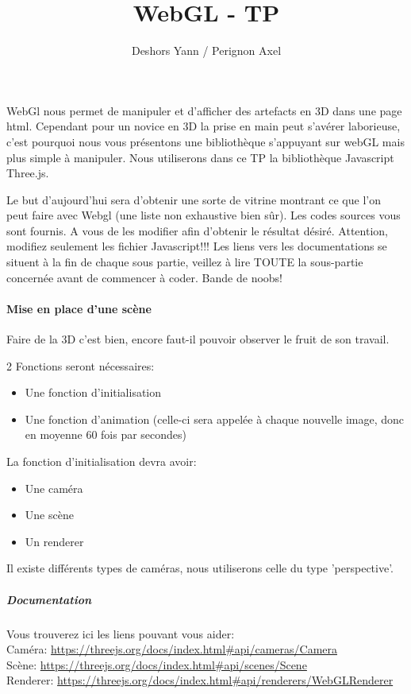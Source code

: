 \documentclass[a4paper,10pt]{article}
\title{WebGL - TP}
\author{Deshors Yann / Perignon Axel}
\begin{document}
\maketitle

WebGl nous permet de manipuler et d'afficher des artefacts en 3D dans une page html.
Cependant pour un novice en 3D la prise en main peut s'avérer laborieuse, c'est pourquoi nous vous présentons une bibliothèque s'appuyant sur webGL mais plus simple à manipuler.
Nous utiliserons dans ce TP la bibliothèque Javascript Three.js.

Le but d'aujourd'hui sera d'obtenir une sorte de vitrine montrant ce que l'on peut faire avec Webgl (une liste non exhaustive bien sûr).
Les codes sources vous sont fournis. A vous de les modifier afin d'obtenir le résultat désiré.
Attention, modifiez seulement les fichier Javascript!!!
Les liens vers les documentations se situent à la fin de chaque sous partie, veillez à lire TOUTE la sous-partie concernée avant de commencer à coder.
Bande de noobs!

\paragraph{Mise en place d'une scène}
Faire de la 3D c'est bien, encore faut-il pouvoir observer le fruit de son travail.

 2 Fonctions seront nécessaires:
 \begin{itemize}
  \item Une fonction d'initialisation
  \item Une fonction d'animation (celle-ci sera appelée à chaque nouvelle image, donc en moyenne 60 fois par secondes)
 \end{itemize}
 
 La fonction d'initialisation devra avoir:
\begin{itemize}
 \item Une caméra
 \item Une scène
 \item Un renderer
\end{itemize} 
 Il existe différents types de caméras, nous utiliserons celle du type 'perspective'.
 
 \subparagraph{Documentation}
 Vous trouverez ici les liens pouvant vous aider: \\
 Caméra: \url{https://threejs.org/docs/index.html#api/cameras/Camera} \\
 Scène: \url{https://threejs.org/docs/index.html#api/scenes/Scene} \\
 Renderer: \url{https://threejs.org/docs/index.html#api/renderers/WebGLRenderer} \\
 
\end{document}
